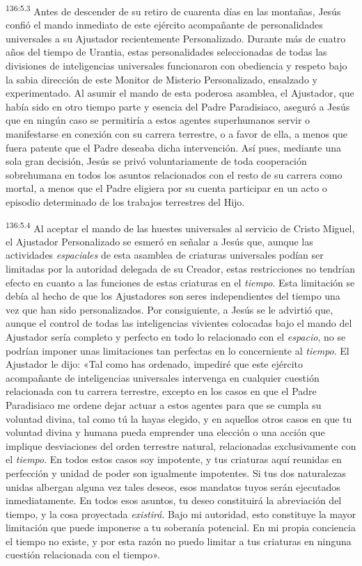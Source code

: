 \par 
\textsuperscript{136:5.3} Antes de descender de su retiro de cuarenta días en las montañas, Jesús confió el mando inmediato de este ejército acompañante de personalidades universales a su Ajustador recientemente Personalizado. Durante más de cuatro años del tiempo de Urantia, estas personalidades seleccionadas de todas las divisiones de inteligencias universales funcionaron con obediencia y respeto bajo la sabia dirección de este Monitor de Misterio Personalizado, ensalzado y experimentado. Al asumir el mando de esta poderosa asamblea, el Ajustador, que había sido en otro tiempo parte y esencia del Padre Paradisiaco, aseguró a Jesús que en ningún caso se permitiría a estos agentes superhumanos servir o manifestarse en conexión con su carrera terrestre, o a favor de ella, a menos que fuera patente que el Padre deseaba dicha intervención. Así pues, mediante una sola gran decisión, Jesús se privó voluntariamente de toda cooperación sobrehumana en todos los asuntos relacionados con el resto de su carrera como mortal, a menos que el Padre eligiera por su cuenta participar en un acto o episodio determinado de los trabajos terrestres del Hijo.

\par 
\textsuperscript{136:5.4} Al aceptar el mando de las huestes universales al servicio de Cristo Miguel, el Ajustador Personalizado se esmeró en señalar a Jesús que, aunque las actividades \textit{espaciales} de esta asamblea de criaturas universales podían ser limitadas por la autoridad delegada de su Creador, estas restricciones no tendrían efecto en cuanto a las funciones de estas criaturas en el \textit{tiempo}. Esta limitación se debía al hecho de que los Ajustadores son seres independientes del tiempo una vez que han sido personalizados. Por consiguiente, a Jesús se le advirtió que, aunque el control de todas las inteligencias vivientes colocadas bajo el mando del Ajustador sería completo y perfecto en todo lo relacionado con el \textit{espacio}, no se podrían imponer unas limitaciones tan perfectas en lo concerniente al \textit{tiempo}. El Ajustador le dijo: «Tal como has ordenado, impediré que este ejército acompañante de inteligencias universales intervenga en cualquier cuestión relacionada con tu carrera terrestre, excepto en los casos en que el Padre Paradisiaco me ordene dejar actuar a estos agentes para que se cumpla su voluntad divina, tal como tú la hayas elegido, y en aquellos otros casos en que tu voluntad divina y humana pueda emprender una elección o una acción que implique desviaciones del orden terrestre natural, relacionadas exclusivamente con el \textit{tiempo}. En todos estos casos soy impotente, y tus criaturas aquí reunidas en perfección y unidad de poder son igualmente impotentes. Si tus dos naturalezas unidas albergan alguna vez tales deseos, esos mandatos tuyos serán ejecutados inmediatamente. En todos esos asuntos, tu deseo constituirá la abreviación del tiempo, y la cosa proyectada \textit{existirá}. Bajo mi autoridad, esto constituye la mayor limitación que puede imponerse a tu soberanía potencial. En mi propia conciencia el tiempo no existe, y por esta razón no puedo limitar a tus criaturas en ninguna cuestión relacionada con el tiempo».

